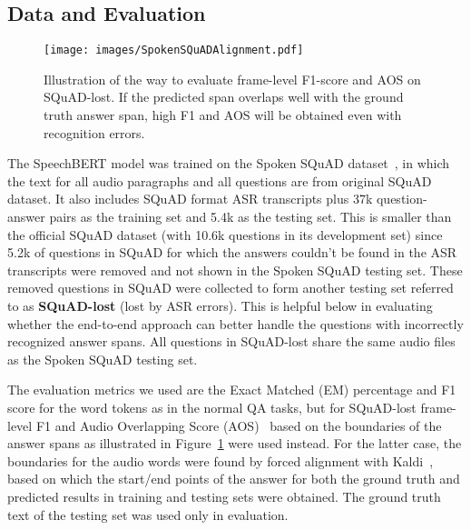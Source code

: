 \documentclass[a4paper]{article}
\begin{document}
\vspace{-5pt}
\subsection{Data and Evaluation}
\label{ssec:data}

\begin{figure}[t!]
    \centering
    \texttt{[image: images/SpokenSQuADAlignment.pdf]}
    \caption{Illustration of the way to evaluate frame-level F1-score and AOS on SQuAD-lost. If the predicted span overlaps well with the ground truth answer span, high F1 and AOS will be obtained even with recognition errors.}
    \label{fig:spokenalign}
\vspace{-20pt}
\end{figure}

\vspace{-5pt}
The SpeechBERT model was trained on the Spoken SQuAD dataset~\cite{Lee2018spoken}, in which the text for all audio paragraphs and all questions are from original SQuAD~\cite{squad2016} dataset. It also includes SQuAD format ASR transcripts plus 37k question-answer pairs as the training set and 5.4k as the testing set. This is smaller than the official SQuAD dataset (with 10.6k questions in its development set) since 5.2k of questions in SQuAD for which the answers couldn't be found in the ASR transcripts were removed and not shown in the Spoken SQuAD testing set. These removed questions in SQuAD were collected to form another testing set referred to as \textbf{SQuAD-lost} (lost by ASR errors). This is helpful below in evaluating whether the end-to-end approach can better handle the questions with incorrectly recognized answer spans. All questions in SQuAD-lost share the same audio files as the Spoken SQuAD testing set.

The evaluation metrics we used are the Exact Matched (EM) percentage and F1 score for the word tokens as in the normal QA tasks, but for SQuAD-lost frame-level F1 and Audio Overlapping Score (AOS)~\cite{Lee2018spoken} based on the boundaries of the answer spans as illustrated in Figure~\ref{fig:spokenalign} were used instead. For the latter case, the boundaries for the audio words were found by forced alignment with Kaldi~\cite{Povey2011}, based on which the start/end points of the answer for both the ground truth and predicted results in training and testing sets were obtained. The ground truth text of the testing set was used only in evaluation.

\vspace{-10pt}
\end{document}
